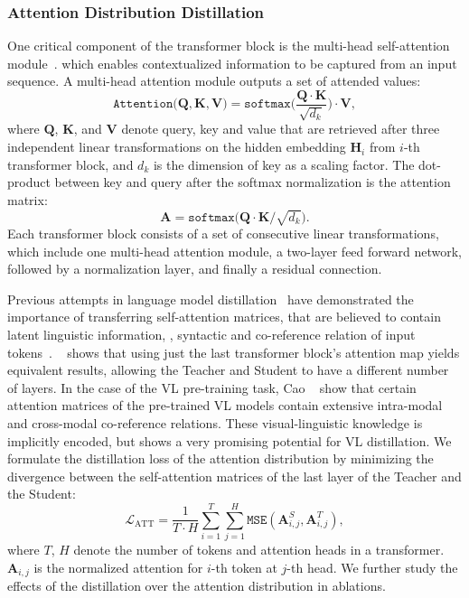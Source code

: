 \subsubsection{Attention Distribution Distillation}
One critical component of the transformer block is the multi-head self-attention module~\cite{vaswani2017attention}.  which enables contextualized information to be captured from an input sequence. A multi-head attention module outputs a set of attended values:
\begin{equation}
    \texttt{Attention(}\mathbf{Q}, \mathbf{K}, \mathbf{V}\text{)}=\texttt{softmax(}\frac{\mathbf{Q}\cdot \mathbf{K}}{\sqrt{d_k}}\text{)}\cdot \mathbf{V},
\end{equation}
where $\mathbf{Q}$, $\mathbf{K}$, and $\mathbf{V}$ denote query, key and value that are retrieved after three independent linear transformations on the hidden embedding $\mathbf{H}_i$ from $i$-th transformer block, and $d_k$ is the dimension of key as a scaling factor. The dot-product between key and query after the softmax normalization is the attention matrix:
\begin{equation}
    \mathbf{A}=\texttt{softmax(}{\mathbf{Q}\cdot \mathbf{K}}/{\sqrt{d_k}}\text{)}.
\end{equation}
Each transformer block consists of a set of consecutive linear transformations, which include one multi-head attention module, a two-layer feed forward network, followed by a normalization layer, and finally a residual connection.


Previous attempts in language model distillation~\cite{jiao2019tinybert, sun2020mobilebert} have demonstrated the importance of transferring self-attention matrices, that are believed to contain latent linguistic information, \eg, syntactic and co-reference relation of input tokens~\cite{clark2019does,jawahar2019does}. 
~\cite{wang2020minilm} shows that using just the last transformer block's attention map yields equivalent results, allowing the Teacher and Student to have a different number of layers. In the case of the VL pre-training task, Cao \etal~\cite{cao2020behind} show that certain attention matrices of the pre-trained VL models contain extensive intra-modal and cross-modal co-reference relations.
These visual-linguistic knowledge is implicitly encoded, but shows a very promising potential for VL distillation.
We formulate the distillation loss of the attention distribution by minimizing the divergence between the self-attention matrices of the last layer of the Teacher and the Student:
\begin{equation}
    \mathcal{L}_\text{ATT} = \frac{1}{T\!\cdot\!H}\sum_{i=1}^{T}\sum_{j=1}^{H} \texttt{MSE}(\mathbf{A}^S_{i, j}, \mathbf{A}^T_{i, j}),
\end{equation}
where $T$, $H$ denote the number of tokens and attention heads in a transformer. $\mathbf{A}_{i, j}$ is the normalized attention for $i$-th token at $j$-th head. 
We further study the effects of the distillation over the attention distribution in ablations.

